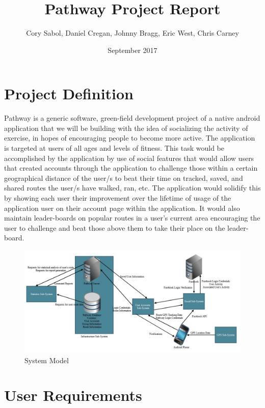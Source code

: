\documentclass{article}
\title{Pathway Project Report}
\author{Cory Sabol, Daniel Cregan, Johnny Bragg, Eric West, Chris Carney}
\date{September 2017}
\begin{document}
\maketitle

\pagebreak

\tableofcontents

\pagebreak

\section{Project Definition}
Pathway is a generic software, green-field development project of a native android application that we will be building with the idea of socializing the activity of exercise, in hopes of encouraging people to become more active. The application is targeted at users of all ages and levels of fitness. This task would be accomplished by the application by use of social features that would allow users that created accounts through the application to challenge those within a certain geographical distance of the user/s to beat their time on tracked, saved, and shared routes the user/s have walked, ran, etc. The application would solidify this by showing each user their improvement over the lifetime of usage of the application user on their account page within the application. It would also maintain leader-boards on popular routes in a user's current area encouraging the user to challenge and beat those above them to take their place on the leader-board.
\begin{figure}[!htb]
    \centering
    \includegraphics[width=\textwidth]{system_model.jpg}
    \caption{System Model}
    \label{fig:my_label}
\end{figure}

\pagebreak

\section{User Requirements}
\end{document}
